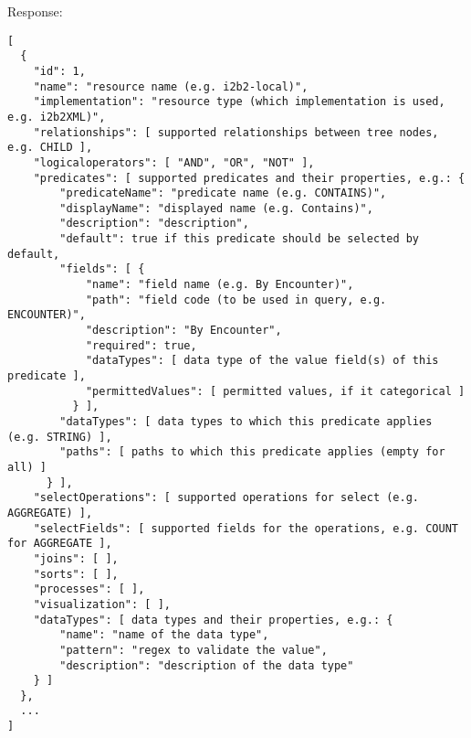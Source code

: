 Response:
\begin{verbatim}
[
  {
    "id": 1,
    "name": "resource name (e.g. i2b2-local)",
    "implementation": "resource type (which implementation is used, e.g. i2b2XML)",
    "relationships": [ supported relationships between tree nodes, e.g. CHILD ],
    "logicaloperators": [ "AND", "OR", "NOT" ],
    "predicates": [ supported predicates and their properties, e.g.: {
        "predicateName": "predicate name (e.g. CONTAINS)",
        "displayName": "displayed name (e.g. Contains)",
        "description": "description",
        "default": true if this predicate should be selected by default,
        "fields": [ {
            "name": "field name (e.g. By Encounter)",
            "path": "field code (to be used in query, e.g. ENCOUNTER)",
            "description": "By Encounter",
            "required": true,
            "dataTypes": [ data type of the value field(s) of this predicate ],
            "permittedValues": [ permitted values, if it categorical ]
          } ],
        "dataTypes": [ data types to which this predicate applies (e.g. STRING) ],
        "paths": [ paths to which this predicate applies (empty for all) ]
      } ],
    "selectOperations": [ supported operations for select (e.g. AGGREGATE) ],
    "selectFields": [ supported fields for the operations, e.g. COUNT for AGGREGATE ],
    "joins": [ ],
    "sorts": [ ],
    "processes": [ ],
    "visualization": [ ],
    "dataTypes": [ data types and their properties, e.g.: {
        "name": "name of the data type",
        "pattern": "regex to validate the value",
        "description": "description of the data type"
    } ]
  },
  ...
]
\end{verbatim}


